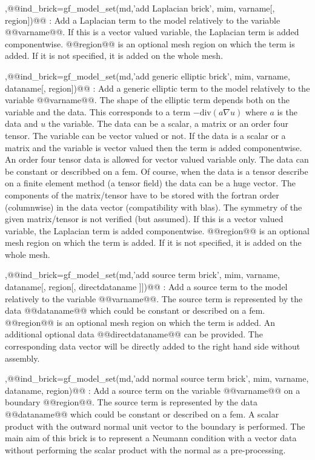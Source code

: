 \begin{cmddescription}
\sep{@@ind_brick=gf_model_set(md,'add Laplacian brick', \tmim mim, \tstr varname[, \tint region])@@} :
Add a Laplacian term to the model relatively to the variable @@varname@@.
If this is a vector valued variable, the Laplacian term is added
componentwise. @@region@@ is an optional mesh region on which the term is added. If it is not specified, it is added on the whole mesh.

\sep{@@ind_brick=gf_model_set(md,'add generic elliptic  brick', \tmim mim, \tstr varname, \tstr dataname[, \tint region])@@} :
Add a generic elliptic term to the model relatively to the variable @@varname@@.
The shape of the elliptic
term depends both on the variable and the data. This corresponds to a
term $-\text{div}(a\nabla u)$ where $a$ is the data and $u$ the variable.
The data can be a scalar, a matrix or an order four tensor. The variable
can be vector valued or not. If the data is a scalar or a matrix and
the variable is vector valued then the term is added componentwise.
An order four tensor data is allowed for vector valued variable only.
The data can be constant or describbed on a fem. Of course, when
the data is a tensor describe on a finite element method (a tensor
field) the data can be a huge vector. The components of the
matrix/tensor have to be stored with the fortran order (columnwise) in
the data vector (compatibility with blas). The symmetry of the given
matrix/tensor is not verified (but assumed).
If this is a vector valued variable, the Laplacian term is added
componentwise. @@region@@ is an optional mesh region on which the term is 
added. If it is not specified, it is added on the whole mesh.

\sep{@@ind_brick=gf_model_set(md,'add source term  brick', \tmim mim, \tstr varname, \tstr dataname[, \tint region[, \tstr directdataname ]])@@} :
Add a source term to the model relatively to the variable @@varname@@.
The source term is represented by the data @@dataname@@ which could be
constant or described on a fem.  @@region@@ is an optional mesh region
on which the term is added. An additional optional data @@directdataname@@
can be provided. The corresponding data vector will be directly added
to the right hand side without assembly.

\sep{@@ind_brick=gf_model_set(md,'add normal source term  brick', \tmim mim, \tstr varname, \tstr dataname, \tint region)@@} :
Add a source term on the variable @@varname@@ on a boundary @@region@@.
The source term is
represented by the data @@dataname@@ which could be constant or described
on a fem. A scalar product with the outward normal unit vector to
the boundary is performed. The main aim of this brick is to represent
a Neumann condition with a vector data without performing the
scalar product with the normal as a pre-processing.


\end{cmddescription}
